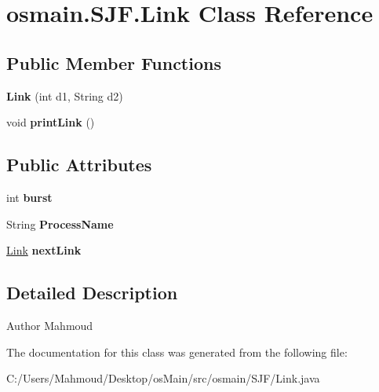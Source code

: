 \hypertarget{classosmain_1_1_s_j_f_1_1_link}{}\section{osmain.\+S\+J\+F.\+Link Class Reference}
\label{classosmain_1_1_s_j_f_1_1_link}
\subsection*{Public Member Functions}
\begin{DoxyCompactItemize}
\item 
{\bfseries Link} (int d1, String d2)\hypertarget{classosmain_1_1_s_j_f_1_1_link_a1d3a5398a92940935528a16eb6ff228d}{}\label{classosmain_1_1_s_j_f_1_1_link_a1d3a5398a92940935528a16eb6ff228d}

\item 
void {\bfseries print\+Link} ()\hypertarget{classosmain_1_1_s_j_f_1_1_link_a7f0df46695b5fd96f82c1da37183373a}{}\label{classosmain_1_1_s_j_f_1_1_link_a7f0df46695b5fd96f82c1da37183373a}

\end{DoxyCompactItemize}
\subsection*{Public Attributes}
\begin{DoxyCompactItemize}
\item 
int {\bfseries burst}\hypertarget{classosmain_1_1_s_j_f_1_1_link_a244ce28afbf77458a28c4a9602999eae}{}\label{classosmain_1_1_s_j_f_1_1_link_a244ce28afbf77458a28c4a9602999eae}

\item 
String {\bfseries Process\+Name}\hypertarget{classosmain_1_1_s_j_f_1_1_link_a3d6a3fb7031d636846edd4df0cafe160}{}\label{classosmain_1_1_s_j_f_1_1_link_a3d6a3fb7031d636846edd4df0cafe160}

\item 
\hyperlink{classosmain_1_1_s_j_f_1_1_link}{Link} {\bfseries next\+Link}\hypertarget{classosmain_1_1_s_j_f_1_1_link_a5bf3b0d87997fa46185854ef0c2265e9}{}\label{classosmain_1_1_s_j_f_1_1_link_a5bf3b0d87997fa46185854ef0c2265e9}

\end{DoxyCompactItemize}


\subsection{Detailed Description}
\begin{DoxyAuthor}{Author}
Mahmoud 
\end{DoxyAuthor}


The documentation for this class was generated from the following file\+:\begin{DoxyCompactItemize}
\item 
C\+:/\+Users/\+Mahmoud/\+Desktop/os\+Main/src/osmain/\+S\+J\+F/Link.\+java\end{DoxyCompactItemize}
